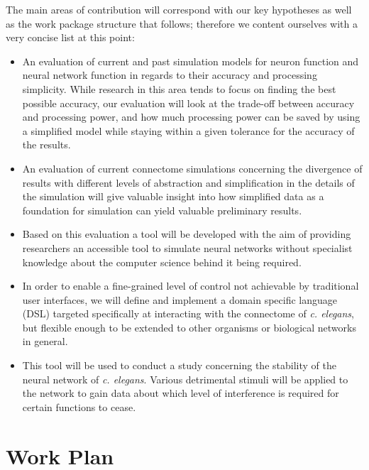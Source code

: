 \documentclass[a4paper,11pt]{article}
\begin{document}
The main areas of contribution will correspond with our key hypotheses as well as the work package structure that follows; therefore we content ourselves with a very concise list at this point:
\begin{itemize} 
  \item An evaluation of current and past simulation models for neuron function and neural network function in regards to their accuracy and processing simplicity. While research in this area tends to focus on finding the best possible accuracy, our evaluation will look at the trade-off between accuracy and processing power, and how much processing power can be saved by using a simplified model while staying within a given tolerance for the accuracy of the results.
  \item An evaluation of current connectome simulations concerning the divergence of results with different levels of abstraction and simplification in the details of the simulation will give valuable insight into how simplified data as a foundation for simulation can yield valuable preliminary results.
  \item Based on this evaluation a tool will be developed with the aim of providing researchers an accessible tool to simulate neural networks without specialist knowledge about the computer science behind it being required.
  \item In order to enable a fine-grained level of control not achievable by traditional user interfaces, we will define and implement a domain specific language (DSL) targeted specifically at interacting with the connectome of \emph{c. elegans}, but flexible enough to be extended to other organisms or biological networks in general.
  \item This tool will be used to conduct a study concerning the stability of the neural network of \emph{c. elegans}. Various detrimental stimuli will be applied to the network to gain data about which level of interference is required for certain functions to cease.
\end{itemize}




\section{Work Plan}
\end{document}
